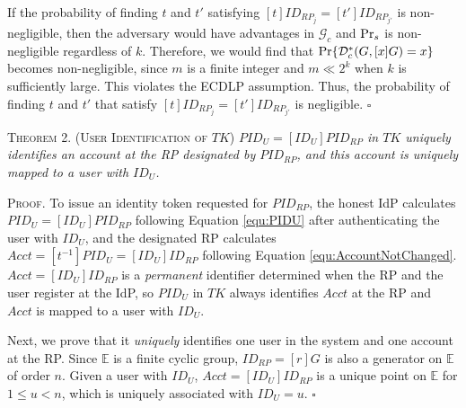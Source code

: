 \newc
If the probability of finding $t$ and $t'$ satisfying $[t]ID_{RP_j} = [t']ID_{RP_{j'}}$ is non-negligible,
 then the adversary would have advantages in $\mathcal{G}_c$ and ${\rm Pr}_s$ is non-negligible regardless of $k$.
Therefore, we would find that ${\rm Pr}\{\mathcal{D}^*_c(G, [x]G)=x\}$ becomes non-negligible, since $m$ is a finite integer and $m \ll 2^k$ when $k$ is sufficiently large.
\oldc
This violates the ECDLP assumption. Thus, the probability of finding $t$ and $t'$ that satisfy $[t]ID_{RP_j} = [t']ID_{RP_{j'}}$ is negligible. \hfill $\square$


\newc
\vspace{1mm}
\noindent\textsc{Theorem 2. (User Identification of $TK$)} {\em $PID_U= [ID_U]PID_{RP}$ in $TK$ uniquely identifies an account at the RP designated by $PID_{RP}$, and this account is uniquely mapped to a user with $ID_U$.}


\vspace{0.75mm}
\noindent\textsc{Proof.}
To issue an identity token requested for $PID_{RP}$,
    the honest IdP calculates $PID_U = [ID_U]PID_{RP}$ following Equation \ref{equ:PIDU} after authenticating the user with $ID_U$,
and the designated RP calculates $Acct = [t^{-1}]PID_{U} = [ID_U]ID_{RP}$ following Equation \ref{equ:AccountNotChanged}.
$Acct = [ID_U]ID_{RP}$ is a \emph{permanent} identifier determined when the RP and the user register at the IdP,
so $PID_U$ in $TK$ always identifies $Acct$ at the RP and $Acct$ is mapped to a user with $ID_U$.

Next, we prove that it \emph{uniquely} identifies one user in the system and one account at the RP.
Since $\mathbb{E}$ is a finite cyclic group, $ID_{RP} = [r]G$ is also a generator on $\mathbb{E}$ of order $n$. Given a user with $ID_U$, $Acct = [ID_U]ID_{RP}$ is a unique point on $\mathbb{E}$ for $1 \leq u < n$, which is uniquely associated with $ID_U=u$. \hfill $\square$


